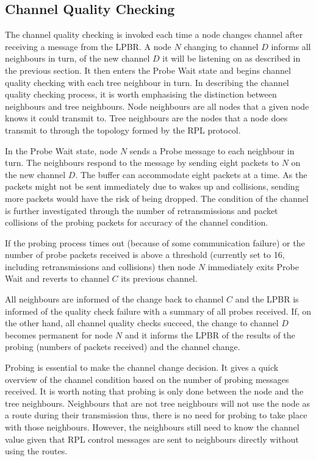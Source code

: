 \subsection{Channel Quality Checking}
\label{sec:channelquality}

The channel quality checking is invoked each time a node changes channel after receiving a message from the LPBR. A node $N$ changing to channel $D$ informs all neighbours in turn, of the new channel $D$ it will be listening on as described in the previous section. It then enters the Probe Wait state and begins channel quality checking with each tree neighbour in turn. In describing the channel quality checking process, it is worth emphasising the  distinction between neighbours and tree neighbours. Node neighbours are all nodes that a given node knows it could transmit to. Tree neighbours are the nodes that a node does transmit to through the topology formed by the RPL protocol. 

In the Probe Wait state, node $N$ sends a Probe message to each neighbour in turn. The neighbours respond to the message by sending eight packets to $N$ on the new channel $D$. 
The buffer can accommodate eight packets at a time. As the packets might not be sent immediately due to wakes up and collisions, sending more packets would have the risk of being dropped. 
The condition of the channel is further investigated through the number of retransmissions and packet collisions of the probing packets for accuracy of the channel condition. 

If the probing process times out (because of some communication failure) or the number of probe packets received is above a threshold (currently set to 16, including retransmissions and collisions) then node $N$ immediately exits Probe Wait and reverts to channel $C$ its previous channel. 


All neighbours are informed of the change back to channel $C$ and the LPBR is informed of the quality check failure with a summary of all probes received.
If, on the other hand, all channel quality checks succeed, the change to channel $D$ becomes permanent for node $N$ and it informs the LPBR of the results of the probing (numbers of packets received) and the channel change.

Probing is essential to make the channel change decision. It gives a quick overview of the channel condition based on the number of probing messages received. It is worth noting that probing is only done between the node and the tree neighbours. Neighbours that are not tree neighbours will not use the node as a route during their transmission thus, there is no need for probing to take place with those neighbours. However, the neighbours still need to know the channel value given that RPL control messages are sent to neighbours directly without using the routes.

